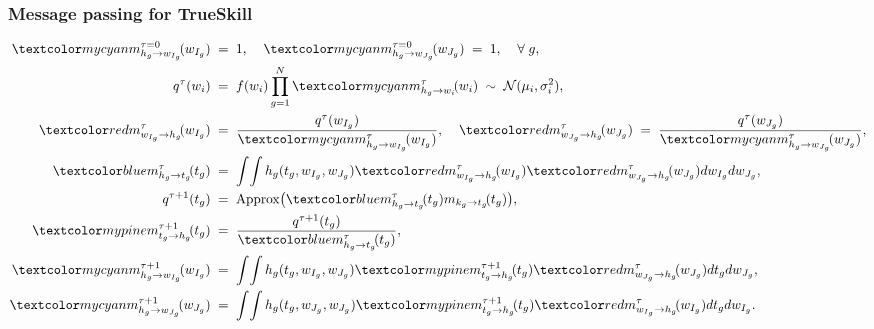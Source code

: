 \begin{frame}
\frametitle{Message passing for TrueSkill}

\[
\begin{split}
\Cyan{m^{\tau=0}_{h_g\rightarrow w_{I_g}}\!(w_{I_g})}\;&=\;1,\;\;\;\;
\Cyan{m^{\tau=0}_{h_g\rightarrow w_{J_g}}\!(w_{J_g})}\;=\;1,\;\;\;\;\forall\;g,\\
q^\tau(w_i)\;&=\;f(w_i)\prod_{g=1}^N \Cyan{m^\tau_{h_g\rightarrow w_i}\!(w_i)}
\;\sim\;\N(\mu_i,\sigma^2_i),\\
\Red{m^\tau_{w_{I_g}\rightarrow h_g}\!(w_{I_g})}\;&=\;
\frac{q^\tau(w_{I_g})}{\Cyan{m^\tau_{h_g\rightarrow w_{I_g}}\!(w_{I_g})}},\;\;\;\;
\Red{m^\tau_{w_{J_g}\rightarrow h_g}\!(w_{J_g})}\;=\;
\frac{q^\tau(w_{J_g})}{\Cyan{m^\tau_{h_g\rightarrow w_{J_g}}\!(w_{J_g})}},\\
\Blue{m^\tau_{h_g\rightarrow t_g}\!(t_g)}\;&=\;
\int\!\int h_g(t_g,w_{I_g},w_{J_g}) \Red{m^\tau_{w_{I_g}\rightarrow h_g}\!(w_{I_g})}
\Red{m^\tau_{w_{J_g}\rightarrow h_g}\!(w_{J_g})}dw_{I_g}dw_{J_g},\\
q^{\tau+1}(t_g)\;&=\;{\rm Approx}
\big(\Blue{m^\tau_{h_g\rightarrow t_g}\!(t_g)}m_{k_g\rightarrow t_g}\!(t_g)\big),\\
\Green{m^{\tau+1}_{t_g\rightarrow h_g}\!(t_g)}\;&=\;
\frac{q^{\tau+1}(t_g)}{\Blue{m^\tau_{h_g\rightarrow t_g}\!(t_g)}},\\
\Cyan{m^{\tau+1}_{h_g\rightarrow w_{I_g}}\!(w_{I_g})}\;&=\;\int\!\int
h_g(t_g,w_{I_g},w_{J_g})\Green{m^{\tau+1}_{t_g\rightarrow h_g}\!(t_g)}
\Red{m^\tau_{w_{J_g}\rightarrow h_g}\!(w_{J_g})}dt_gdw_{J_g},\\
\Cyan{m^{\tau+1}_{h_g\rightarrow w_{J_g}}\!(w_{J_g})}\;&=\;\int\!\int
h_g(t_g,w_{J_g},w_{J_g})\Green{m^{\tau+1}_{t_g\rightarrow h_g}\!(t_g)}
\Red{m^\tau_{w_{I_g}\rightarrow h_g}\!(w_{I_g})}dt_gdw_{I_g}.
\end{split}
\]
\end{frame}


